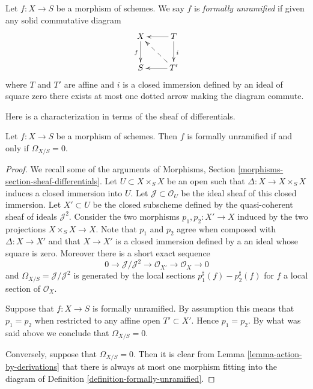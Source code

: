 \begin{definition}
\label{definition-formally-unramified}
Let $f : X \to S$ be a morphism of schemes.
We say $f$ is {\it formally unramified} if given any solid commutative diagram
$$
\xymatrix{
X \ar[d]_f & T \ar[d]^i \ar[l] \\
S & T' \ar[l] \ar@{-->}[lu]
}
$$
where $T$ and $T'$ are affine and $i$ is a closed immersion defined
by an ideal of square zero there exists at most one
dotted arrow making the diagram commute.
\end{definition}

\noindent
Here is a characterization in terms of the sheaf of differentials.

\begin{lemma}
\label{lemma-formally-unramified-differentials}
Let $f : X \to S$ be a morphism of schemes.
Then $f$ is formally unramified if and only if $\Omega_{X/S} = 0$.
\end{lemma}

\begin{proof}
We recall some of the arguments of
Morphisms, Section \ref{morphisms-section-sheaf-differentials}.
Let $U \subset X \times_S X$ be an open such that
$\Delta : X \to X \times_S X$ induces a closed immersion into $U$.
Let $\mathcal{J} \subset \mathcal{O}_U$ be the ideal sheaf of this
closed immersion. Let $X' \subset U$ be the closed subscheme
defined by the quasi-coherent sheaf of ideals $\mathcal{J}^2$.
Consider the two morphisms $p_1, p_2 : X' \to X$ induced by
the two projections $X \times_S X \to X$.
Note that $p_1$ and $p_2$ agree when composed with $\Delta : X \to X'$
and that $X \to X'$ is a closed immersion defined by a an ideal
whose square is zero. Moreover there is a short exact sequence
$$
0 \to \mathcal{J}/\mathcal{J}^2 \to \mathcal{O}_{X'} \to \mathcal{O}_X \to 0
$$
and $\Omega_{X/S} = \mathcal{J}/\mathcal{J}^2$ is generated by the local
sections $p_1^\sharp(f) - p_2^\sharp(f)$ for $f$ a local section of
$\mathcal{O}_X$.

\medskip\noindent
Suppose that $f : X \to S$ is formally unramified.
By assumption this means that $p_1 = p_2$ when restricted to any
affine open $T' \subset X'$. Hence $p_1 = p_2$. By what was said above
we conclude that $\Omega_{X/S} = 0$.

\medskip\noindent
Conversely, suppose that $\Omega_{X/S} = 0$.
Then it is clear from Lemma \ref{lemma-action-by-derivations}
that there is always at most one morphism fitting into the diagram of
Definition \ref{definition-formally-unramified}.
\end{proof}

